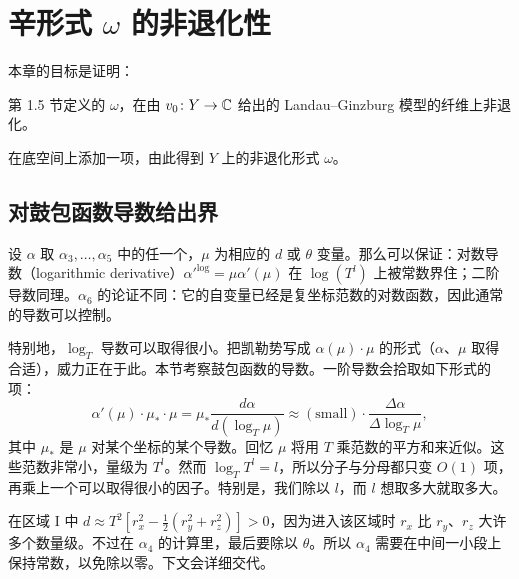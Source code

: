 \section{辛形式 $\omega$ 的非退化性}

本章的目标是证明：

\begin{lemma}\label{lem:omega-fiber}
第 1.5 节定义的 $\omega$，在由 $v_0\colon Y\to\mathbb{C}$ 给出的 Landau–Ginzburg 模型的纤维上非退化。
\end{lemma}

\begin{corollary}\label{cor:omega-y}
在底空间上添加一项，由此得到 $Y$ 上的非退化形式 $\omega$。
\end{corollary}


\subsection{对鼓包函数导数给出界}

\begin{claim}[对数导数便于作出估计]\label{claim:log-bounds}
设 $\alpha$ 取 $\alpha_3,\dots,\alpha_5$ 中的任一个，$\mu$ 为相应的 $d$ 或 $\theta$ 变量。那么可以保证：对数导数（logarithmic derivative）${\alpha'}^{\log}=\mu\alpha'(\mu)$ 在 $\log(T^l)$ 上被常数界住；二阶导数同理。$\alpha_6$ 的论证不同：它的自变量已经是复坐标范数的对数函数，因此通常的导数可以控制。
\end{claim}

特别地，$\log_T$ 导数可以取得很小。把凯勒势写成 $\alpha(\mu)\cdot\mu$ 的形式（$\alpha$、$\mu$ 取得合适），威力正在于此。本节考察鼓包函数的导数。一阶导数会拾取如下形式的项：
\[
\alpha'(\mu)\cdot\mu_*\cdot\mu=\mu_*\frac{d\alpha}{d(\log_T\mu)}
\approx(\text{small})\cdot\frac{\Delta\alpha}{\Delta\log_T\mu},
\]
其中 $\mu_*$ 是 $\mu$ 对某个坐标的某个导数。回忆 $\mu$ 将用 $T$ 乘范数的平方和来近似。这些范数非常小，量级为 $T^l$。然而 $\log_TT^l=l$，所以分子与分母都只变 $O(1)$ 项，再乘上一个可以取得很小的因子。特别是，我们除以 $l$，而 $l$ 想取多大就取多大。

\begin{remark}\label{rem:enough-space}
在区域 I 中 $d\approx T^2[r_x^2-\frac12(r_y^2+r_z^2)]>0$，因为进入该区域时 $r_x$ 比 $r_y$、$r_z$ 大许多个数量级。不过在 $\alpha_4$ 的计算里，最后要除以 $\theta$。所以 $\alpha_4$ 需要在中间一小段上保持常数，以免除以零。下文会详细交代。
\end{remark}

